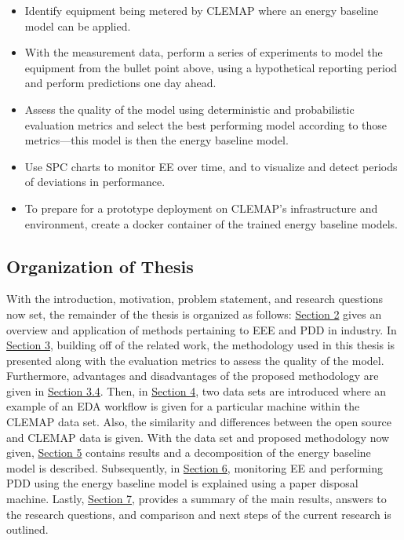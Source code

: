 \begin{itemize}
    \item Identify equipment being metered by CLEMAP where an energy baseline model can be applied.
    
    \item With the measurement data, perform a series of experiments to model the equipment from the bullet point above, using a hypothetical reporting period and perform predictions one day ahead.
    
    \item Assess the quality of the model using deterministic and probabilistic evaluation metrics and select the best performing model according to those metrics—this model is then the energy baseline model.
    
    \item Use \ac{SPC} charts to monitor EE over time, and to visualize and detect periods of deviations in performance. 
    
    \item To prepare for a prototype deployment on CLEMAP's infrastructure and environment, create a docker container of the trained energy baseline models.
\end{itemize}

\subsection{Organization of Thesis}

With the introduction, motivation, problem statement, and research questions now set, the remainder of the thesis is organized as follows: \hyperlink{section.2}{Section 2} gives an overview and application of methods pertaining to EEE and PDD in industry. In \hyperlink{section.3}{Section 3}, building off of the related work, the methodology used in this thesis is presented along with the evaluation metrics to assess the quality of the model. Furthermore, advantages and disadvantages of the proposed methodology are given in \hyperlink{subsection.3.4}{Section 3.4}. Then, in \hyperlink{section.4}{Section 4}, two data sets are introduced where an example of an \ac{EDA} workflow is given for a particular machine within the CLEMAP data set. Also, the similarity and differences between the open source and CLEMAP data is given. With the data set and proposed methodology now given, \hyperlink{section.5}{Section 5} contains results and a decomposition of the energy baseline model is described. Subsequently, in \hyperlink{section.6}{Section 6}, monitoring EE and performing PDD using the energy baseline model is explained using a paper disposal machine. Lastly, \hyperlink{section.7}{Section 7}, provides a summary of the main results, answers to the research questions, and comparison and next steps of the current research is outlined.
